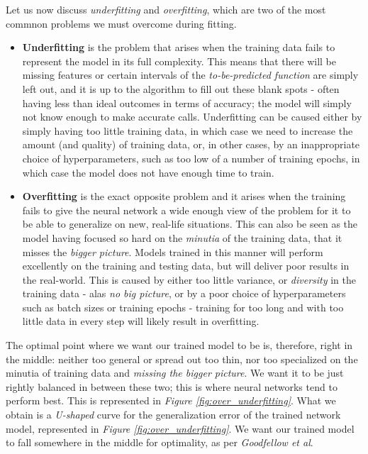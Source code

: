 Let us now discuss \textit{underfitting} and \textit{overfitting}, which are two of the most commnon problems we must overcome during fitting.
\begin{itemize}
    \item \textbf{Underfitting} is the problem that arises when the training data fails to represent the model in its full complexity. This means that there will be missing features or certain intervals of the \textit{to-be-predicted function} are simply left out, and it is up to the algorithm to fill out these blank spots - often having less than ideal outcomes in terms of accuracy; the model will simply not know enough to make accurate calls. Underfitting can be caused either by simply having too little training data, in which case we need to increase the amount (and quality) of training data, or, in other cases, by an inappropriate choice of hyperparameters, such as too low of a number of training epochs, in which case the model does not have enough time to train.
    \item \textbf{Overfitting} is the exact opposite problem and it arises when the training fails to give the neural network a wide enough view of the problem for it to be able to generalize on new, real-life situations. This can also be seen as the model having focused so hard on the \textit{minutia} of the training data, that it misses the \textit{bigger picture}. Models trained in this manner will perform excellently on the training and testing data, but will deliver poor results in the real-world. This is caused by either too little variance, or \textit{diversity} in the training data - alas \textit{no big picture}, or by a poor choice of hyperparameters such as batch sizes or training epochs - training for too long and with too little data in every step will likely result in overfitting.
\end{itemize}

The optimal point where we want our trained model to be is, therefore, right in the middle: neither too general or spread out too thin, nor too specialized on the minutia of training data and \textit{missing the bigger picture}. We want it to be just rightly balanced in between these two; this is where neural networks tend to perform best. This is represented in \textit{Figure \ref{fig:over_underfitting}}. What we obtain is a \textit{U-shaped} curve for the generalization error of the trained network model, represented in \textit{Figure \ref{fig:over_underfitting}}. We want our trained model to fall somewhere in the middle for optimality, as per \textit{Goodfellow et al}. \cite{Goodfellow-et-al-2016}

